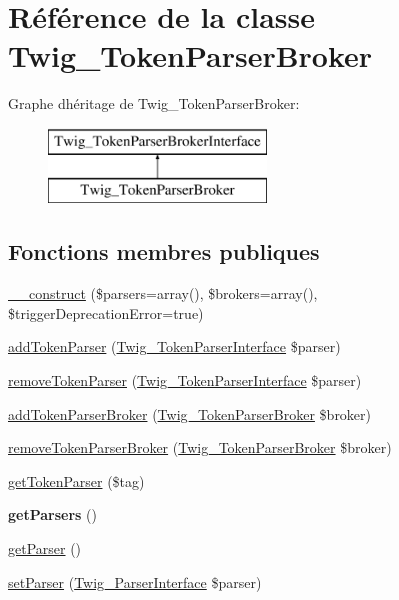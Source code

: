 \hypertarget{class_twig___token_parser_broker}{}\section{Référence de la classe Twig\+\_\+\+Token\+Parser\+Broker}
\label{class_twig___token_parser_broker}
Graphe d\textquotesingle{}héritage de Twig\+\_\+\+Token\+Parser\+Broker\+:\begin{figure}[H]
\begin{center}
\leavevmode
\includegraphics[height=2.000000cm]{class_twig___token_parser_broker}
\end{center}
\end{figure}
\subsection*{Fonctions membres publiques}
\begin{DoxyCompactItemize}
\item 
\hyperlink{class_twig___token_parser_broker_ac02f22a6d96a23717d2c4f2927cddd8c}{\+\_\+\+\_\+construct} (\$parsers=array(), \$brokers=array(), \$trigger\+Deprecation\+Error=true)
\item 
\hyperlink{class_twig___token_parser_broker_a8f805d29eac2b8ce1da513e9390952f3}{add\+Token\+Parser} (\hyperlink{interface_twig___token_parser_interface}{Twig\+\_\+\+Token\+Parser\+Interface} \$parser)
\item 
\hyperlink{class_twig___token_parser_broker_aa4402c2e54d4c1a7b89b175084465045}{remove\+Token\+Parser} (\hyperlink{interface_twig___token_parser_interface}{Twig\+\_\+\+Token\+Parser\+Interface} \$parser)
\item 
\hyperlink{class_twig___token_parser_broker_a4d48ade56aed5a989f6fe4cf7e40017b}{add\+Token\+Parser\+Broker} (\hyperlink{class_twig___token_parser_broker}{Twig\+\_\+\+Token\+Parser\+Broker} \$broker)
\item 
\hyperlink{class_twig___token_parser_broker_a8089187f9f7ad48dac1e6ebe7efdb8ba}{remove\+Token\+Parser\+Broker} (\hyperlink{class_twig___token_parser_broker}{Twig\+\_\+\+Token\+Parser\+Broker} \$broker)
\item 
\hyperlink{class_twig___token_parser_broker_adff2d8a3b28dce12e0bccd335af4012f}{get\+Token\+Parser} (\$tag)
\item 
{\bfseries get\+Parsers} ()\hypertarget{class_twig___token_parser_broker_a79cfaa4562ab2e470afc52c22acd1917}{}\label{class_twig___token_parser_broker_a79cfaa4562ab2e470afc52c22acd1917}

\item 
\hyperlink{class_twig___token_parser_broker_a4b6907ea868dc9053e1f7d6260fa4b4f}{get\+Parser} ()
\item 
\hyperlink{class_twig___token_parser_broker_ac16cd9a5f9db326226c01aa3ee943857}{set\+Parser} (\hyperlink{interface_twig___parser_interface}{Twig\+\_\+\+Parser\+Interface} \$parser)
\end{DoxyCompactItemize}

